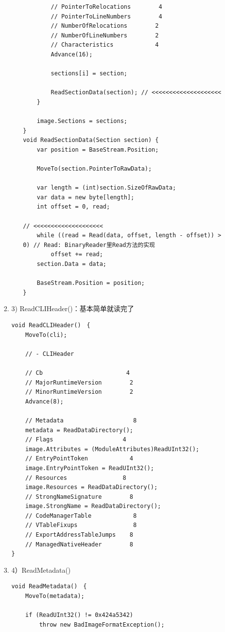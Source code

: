 \documentclass[9pt, b5paper]{article}
\begin{document}
\begin{enumerate}
\begin{enumerate}
\begin{enumerate}
\begin{itemize}
\begin{verbatim}
        // PointerToRelocations        4
        // PointerToLineNumbers        4
        // NumberOfRelocations        2
        // NumberOfLineNumbers        2
        // Characteristics            4
        Advance(16);

        sections[i] = section;

        ReadSectionData(section); // <<<<<<<<<<<<<<<<<<<< 
    }

    image.Sections = sections;
}
void ReadSectionData(Section section) {
    var position = BaseStream.Position;

    MoveTo(section.PointerToRawData);

    var length = (int)section.SizeOfRawData;
    var data = new byte[length];
    int offset = 0, read;

// <<<<<<<<<<<<<<<<<<<< 
    while ((read = Read(data, offset, length - offset)) > 0) // Read: BinaryReader里Read方法的实现
        offset += read;
    section.Data = data;

    BaseStream.Position = position;
}
\end{verbatim}
\end{itemize}
\item 3) ReadCLIHeader()：基本简单就读完了
\label{sec-9-1-3-1-3-3}
\begin{verbatim}
void ReadCLIHeader()　{
    MoveTo(cli);

    // - CLIHeader

    // Cb                        4
    // MajorRuntimeVersion        2
    // MinorRuntimeVersion        2
    Advance(8);

    // Metadata                    8
    metadata = ReadDataDirectory();
    // Flags                    4
    image.Attributes = (ModuleAttributes)ReadUInt32();
    // EntryPointToken            4
    image.EntryPointToken = ReadUInt32();
    // Resources                8
    image.Resources = ReadDataDirectory();
    // StrongNameSignature        8
    image.StrongName = ReadDataDirectory();
    // CodeManagerTable            8
    // VTableFixups                8
    // ExportAddressTableJumps    8
    // ManagedNativeHeader        8
}
\end{verbatim}
\item 4）ReadMetadata()
\label{sec-9-1-3-1-3-4}
\begin{verbatim}
void ReadMetadata()　{
    MoveTo(metadata);

    if (ReadUInt32() != 0x424a5342)
        throw new BadImageFormatException();


\end{verbatim}
\end{enumerate}
\end{enumerate}
\end{enumerate}
\end{document}
